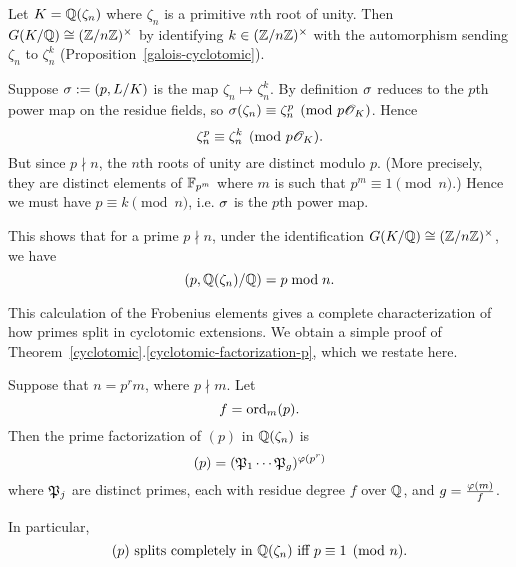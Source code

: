\begin{ex}
Let $K=\mathbb{Q}(\zeta_n)$ where $\zeta_n$ is a primitive $n$th root of unity. Then $G(K/\mathbb{Q})\cong(\mathbb{Z}/n\mathbb{Z})^{\times}$ by identifying $k\in (\mathbb{Z}/n\mathbb{Z})^{\times}$ with the automorphism sending $\zeta_n$ to $\zeta_n^k$ %
(Proposition~\ref{galois-cyclotomic}).

Suppose $\sigma:=(p,L/K)$ is the map $\zeta_n\mapsto\zeta_n^k$. By definition $\sigma$ reduces to the $p$th power map on the residue fields, so $\sigma(\zeta_n)\equiv  \zeta_n^p\pmod{p\mathscr{O}_K}$. Hence
\[
\zeta_n^p\equiv \zeta_n^k\pmod{p\mathscr{O}_K}.
\]
But since $p\nmid n$, the $n$th roots of unity are distinct modulo $p$. (More precisely, they are distinct elements of $\mathbb{F}_{p^m}$ where $m$ is such that $p^m\equiv 1\pmod n$.) Hence we must have $p\equiv k\pmod n$, i.e. $\sigma$ is the $p$th power map.

This shows that for a prime $p\nmid n$, under the identification $G(K/\mathbb{Q})\cong(\mathbb{Z}/n\mathbb{Z})^{\times}$, we have
\[
(p,\mathbb{Q}(\zeta_n)/\mathbb{Q})=p\bmod n.
\]
\end{ex}
This calculation of the Frobenius elements gives a complete characterization of how primes split in cyclotomic extensions. We obtain a simple proof of Theorem~\ref{cyclotomic}.\ref{cyclotomic-factorization-p}, which we restate here.
\begin{thm}
Suppose that $n=p^rm$, where $p\nmid m$. Let 
\[
f=\operatorname{ord}_{m} (p).
\]
Then the prime factorization of $(p)$ in $\mathbb{Q}(\zeta_n)$ is
\[
(p)=(\mathfrak{P}_1\cdots \mathfrak{P}_g)^{\varphi(p^r)}
\]
where $\mathfrak{P}_j$ are distinct primes, each with residue degree $f$ over $\mathbb{Q}$, and $g=\frac{\varphi(m)}{f}$.

In particular, 
\[(p)
\text{ splits completely in $\mathbb{Q}(\zeta_n)$ iff }p\equiv 1\pmod n.\]
\end{thm}

